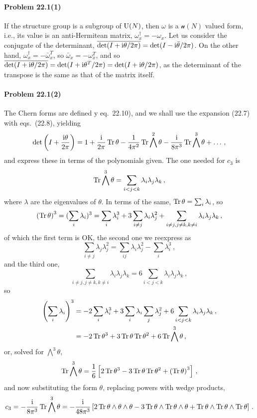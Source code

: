 \documentclass[a4paper,12pt]{article}
\def\imagi{\mathrm{i}}
\def\Tr{\ensuremath{\mathop{\rm Tr}}}
\newcommand{\problem}[1]{\paragraph{Problem #1}}
\begin{document}
\problem{22.1(1)} If the structure group is a subgroup of ${\rm U}(N)$, then $\omega$ is a $\mathcal{u}(N)$ valued form, i.e., its value is an anti-Hermitean matrix, $\omega_x^\dagger = -\omega_x$. Let us consider the conjugate of the determinant, $\overline{{\rm det}(I+\imagi\theta/2\pi)} = {\rm det}(I-\imagi\bar\theta/2\pi)$. On the other hand, $\omega_x^\dagger = -{\bar\omega}_x^T$, so $\bar\omega_x = -\omega_x^T$, and so 
$\overline{{\rm det}(I+\imagi\theta/2\pi)} = {\rm det}(I+\imagi \theta^T/2\pi) = {\rm det}(I+\imagi \theta/2\pi)$, as the determinant of the transpose is the same as that of the matrix itself.


\problem{22.1(2)} The Chern forms are defined y eq.\ 22.10), and we shall use the expansion (22.7) with eqs.\ (22.8), yielding
\[
 {\rm det}\left(I+ \frac{\imagi \theta}{2\pi}\right) = 1+ \frac{\imagi}{2\pi}\Tr\theta - \frac{1}{4\pi^2} \Tr \bigwedge^2\theta  -\frac{\imagi}{8\pi^3}\Tr\bigwedge^3\theta+\dots\,,
\]
and express these in terms of the polynomials given. The one needed for $c_3$ is
\[
 \Tr\bigwedge^3 \theta  = \sum_{i<j<k}\lambda_i\lambda_j\lambda_k\,,
\]
where $\lambda$ are the eigenvalues of $\theta$. In terms of the same, $\Tr\theta= \sum_i \lambda_i$, so
\[
 \left(\Tr \theta\right)^3 = (\sum_i \lambda_i)^3 = \sum_i \lambda_i^3 + 3 \sum_{i\ne j}\lambda_i\lambda_j^2 + \sum_{i\ne j, j\ne k, k\ne i} \lambda_i\lambda_j\lambda_k\,,
\]
of which the first term is OK, the second one we reexpress as
\[
 \sum_{i\ne j}\lambda_j\lambda_j^2 = \sum_{ij}\lambda_i\lambda_j^2 - \sum_i\lambda_i^3\,,
\]
and the third one,
\[
 \sum_{i\ne j, j\ne k, k\ne i}\lambda_i \lambda_j \lambda_k = 6\sum_{i<j<k}\lambda_i \lambda_j \lambda_k\,,
\]
so
\[
\begin{aligned}
 \left(\sum_i\lambda_i\right)^3 &= -2\sum_i \lambda_i^3 + 3\sum_i \lambda_i \sum_j \lambda_j^2 + 6 \sum_{i<j<k}\lambda_i\lambda_j\lambda_k\,,\\
 &= -2\Tr\theta^3 + 3\Tr\theta\Tr\theta^2+6\Tr\bigwedge^3\theta\,,
 \end{aligned}
\]
or, solved for $\bigwedge^3\theta$,
\[
 \Tr\bigwedge^3 \theta= \frac{1}{6}\left[ 2\Tr\theta^3 -3\Tr\theta\Tr\theta^2 +\left(\Tr\theta\right)^3 \right]\,,
\]
and now substituting the form $\theta$, replacing powers with wedge products,
\[
 c_3 =-\frac{\imagi}{8\pi^3}\Tr\bigwedge^3\theta = -\frac{\imagi}{48 \pi^3}\left[2\Tr\theta\wedge\theta\wedge\theta -3\Tr\theta\wedge\Tr\theta\wedge\theta + \Tr\theta\wedge\Tr\theta\wedge\Tr\theta\right]\,.
\]
\end{document}
